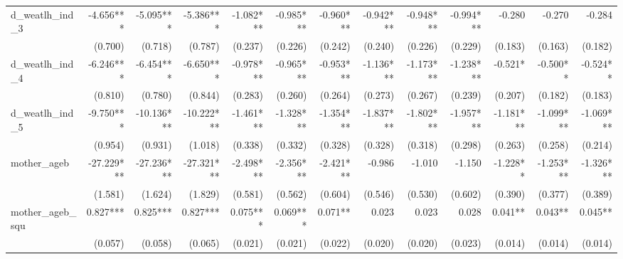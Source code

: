 \begin{tabular}{lrrrrrrrrrrrr}
d\_weatlh\_ind\_3                           &    -4.656*** &    -5.095*** &    -5.386*** &    -1.082*** &    -0.985*** &    -0.960*** &    -0.942*** &    -0.948*** &    -0.994*** &       -0.280 &       -0.270 &       -0.284 \\ 
                                            &      (0.700) &      (0.718) &      (0.787) &      (0.237) &      (0.226) &      (0.242) &      (0.240) &      (0.226) &      (0.229) &      (0.183) &      (0.163) &      (0.182) \\ 
d\_weatlh\_ind\_4                           &    -6.246*** &    -6.454*** &    -6.650*** &    -0.978*** &    -0.965*** &    -0.953*** &    -1.136*** &    -1.173*** &    -1.238*** &      -0.521* &     -0.500** &     -0.524** \\ 
                                            &      (0.810) &      (0.780) &      (0.844) &      (0.283) &      (0.260) &      (0.264) &      (0.273) &      (0.267) &      (0.239) &      (0.207) &      (0.182) &      (0.183) \\ 
d\_weatlh\_ind\_5                           &    -9.750*** &   -10.136*** &   -10.222*** &    -1.461*** &    -1.328*** &    -1.354*** &    -1.837*** &    -1.802*** &    -1.957*** &    -1.181*** &    -1.099*** &    -1.069*** \\ 
                                            &      (0.954) &      (0.931) &      (1.018) &      (0.338) &      (0.332) &      (0.328) &      (0.328) &      (0.318) &      (0.298) &      (0.263) &      (0.258) &      (0.214) \\ 
mother\_ageb                                &   -27.229*** &   -27.236*** &   -27.321*** &    -2.498*** &    -2.356*** &    -2.421*** &       -0.986 &       -1.010 &       -1.150 &     -1.228** &    -1.253*** &    -1.326*** \\ 
                                            &      (1.581) &      (1.624) &      (1.829) &      (0.581) &      (0.562) &      (0.604) &      (0.546) &      (0.530) &      (0.602) &      (0.390) &      (0.377) &      (0.389) \\ 
mother\_ageb\_squ                           &     0.827*** &     0.825*** &     0.827*** &     0.075*** &     0.069*** &      0.071** &        0.023 &        0.023 &        0.028 &      0.041** &      0.043** &      0.045** \\ 
                                            &      (0.057) &      (0.058) &      (0.065) &      (0.021) &      (0.021) &      (0.022) &      (0.020) &      (0.020) &      (0.023) &      (0.014) &      (0.014) &      (0.014) \\ 

\end{tabular}
